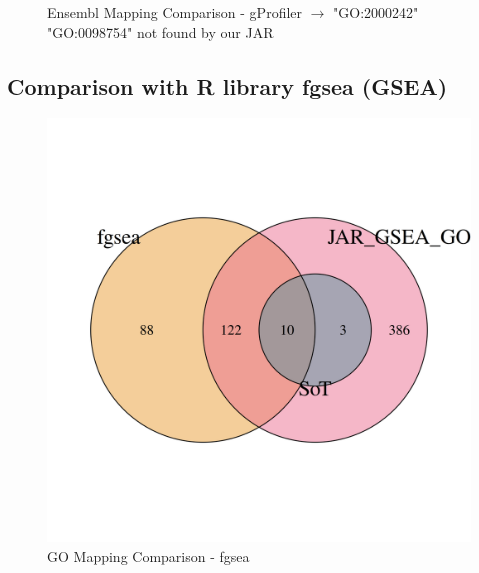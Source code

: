 \documentclass[12pt]{article}
\begin{document}
\begin{figure}[htpb]
\begin{minipage}{0.49\textwidth}
        \caption{Ensembl Mapping Comparison - gProfiler $\to$ "GO:2000242" "GO:0098754" not found by our JAR} 

        \label{fig:ens-mapping-gprofiler}
    \end{minipage}
\end{figure}
\subsection{Comparison with R library fgsea (GSEA)}\label{sec:Comparison-of-GSEA}
\begin{figure}[htpb]
    \centering
    \begin{minipage}{0.49\textwidth}
        \centering
        \includegraphics[width=\textwidth]{./plots/go_mappingCompfgsea.png}
        \caption{GO Mapping Comparison - fgsea}
        \label{fig:go-mapping-fgsea}
    \end{minipage}
    \hfill
    \begin{minipage}{0.49\textwidth}
        \centering

\end{minipage}
\end{figure}
\end{document}

